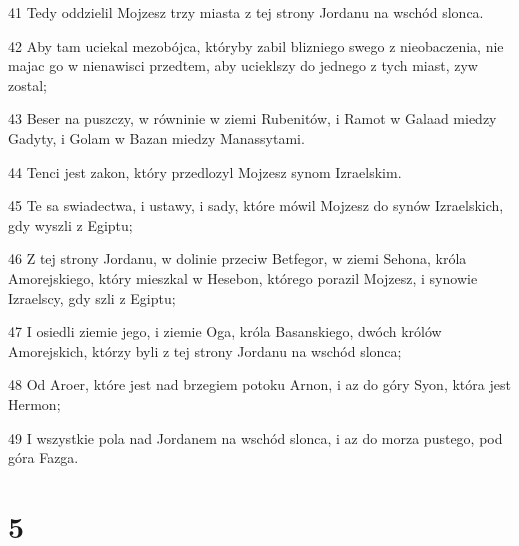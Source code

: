 \par 41 Tedy oddzielil Mojzesz trzy miasta z tej strony Jordanu na wschód slonca.
\par 42 Aby tam uciekal mezobójca, któryby zabil blizniego swego z nieobaczenia, nie majac go w nienawisci przedtem, aby ucieklszy do jednego z tych miast, zyw zostal;
\par 43 Beser na puszczy, w równinie w ziemi Rubenitów, i Ramot w Galaad miedzy Gadyty, i Golam w Bazan miedzy Manassytami.
\par 44 Tenci jest zakon, który przedlozyl Mojzesz synom Izraelskim.
\par 45 Te sa swiadectwa, i ustawy, i sady, które mówil Mojzesz do synów Izraelskich, gdy wyszli z Egiptu;
\par 46 Z tej strony Jordanu, w dolinie przeciw Betfegor, w ziemi Sehona, króla Amorejskiego, który mieszkal w Hesebon, którego porazil Mojzesz, i synowie Izraelscy, gdy szli z Egiptu;
\par 47 I osiedli ziemie jego, i ziemie Oga, króla Basanskiego, dwóch królów Amorejskich, którzy byli z tej strony Jordanu na wschód slonca;
\par 48 Od Aroer, które jest nad brzegiem potoku Arnon, i az do góry Syon, która jest Hermon;
\par 49 I wszystkie pola nad Jordanem na wschód slonca, i az do morza pustego, pod góra Fazga.

\chapter{5}

